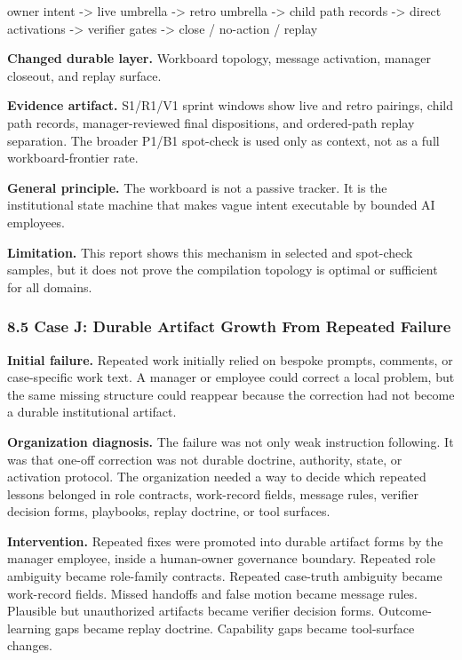 \documentclass[
]{article}
\newenvironment{Shaded}{}{}
\newcommand{\NormalTok}[1]{#1}
\begin{document}
\begin{Shaded}
\begin{Highlighting}[]
\NormalTok{owner intent}
\NormalTok{  {-}\textgreater{} live umbrella}
\NormalTok{  {-}\textgreater{} retro umbrella}
\NormalTok{  {-}\textgreater{} child path records}
\NormalTok{  {-}\textgreater{} direct activations}
\NormalTok{  {-}\textgreater{} verifier gates}
\NormalTok{  {-}\textgreater{} close / no{-}action / replay}
\end{Highlighting}
\end{Shaded}

\textbf{Changed durable layer.} Workboard topology, message activation, manager closeout, and replay surface.

\textbf{Evidence artifact.} S1/R1/V1 sprint windows show live and retro pairings, child path records, manager-reviewed final dispositions, and ordered-path replay separation. The broader P1/B1 spot-check is used only as context, not as a full workboard-frontier rate.

\textbf{General principle.} The workboard is not a passive tracker. It is the institutional state machine that makes vague intent executable by bounded AI employees.

\textbf{Limitation.} This report shows this mechanism in selected and spot-check samples, but it does not prove the compilation topology is optimal or sufficient for all domains.

\subsubsection{8.5 Case J: Durable Artifact Growth From Repeated Failure}\label{case-j-durable-artifact-growth-from-repeated-failure}

\textbf{Initial failure.} Repeated work initially relied on bespoke prompts, comments, or case-specific work text. A manager or employee could correct a local problem, but the same missing structure could reappear because the correction had not become a durable institutional artifact.

\textbf{Organization diagnosis.} The failure was not only weak instruction following. It was that one-off correction was not durable doctrine, authority, state, or activation protocol. The organization needed a way to decide which repeated lessons belonged in role contracts, work-record fields, message rules, verifier decision forms, playbooks, replay doctrine, or tool surfaces.

\textbf{Intervention.} Repeated fixes were promoted into durable artifact forms by the manager employee, inside a human-owner governance boundary. Repeated role ambiguity became role-family contracts. Repeated case-truth ambiguity became work-record fields. Missed handoffs and false motion became message rules. Plausible but unauthorized artifacts became verifier decision forms. Outcome-learning gaps became replay doctrine. Capability gaps became tool-surface changes.
\end{document}

